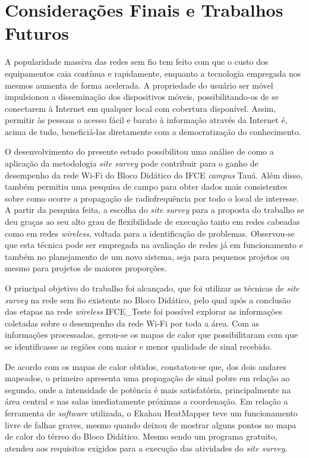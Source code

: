 \chapter{Considerações Finais e Trabalhos Futuros}
\label{cap:conclusoes-e-trabalhos-futuros}

A popularidade massiva das redes sem fio tem feito com que o custo dos equipamentos caia contínua e rapidamente, enquanto a tecnologia empregada nos mesmos aumenta de forma acelerada. A propriedade do usuário ser móvel impulsionou a disseminação dos dispositivos móveis, possibilitando-os de se conectarem à Internet em qualquer local com cobertura disponível. Assim, permitir às pessoas o acesso fácil e barato à informação através da Internet é, acima de tudo, beneficiá-las diretamente com a democratização do conhecimento.

O desenvolvimento do presente estudo possibilitou uma análise de como a aplicação da metodologia \textit{site survey} pode contribuir para o ganho de desempenho da rede Wi-Fi do Bloco Didático do IFCE \textit{campus} Tauá. Além disso, também permitiu uma pesquisa de campo para obter dados mais consistentes sobre como ocorre a propagação de radiofrequência por todo o local de interesse.
A partir da pesquisa feita, a escolha do \textit{site survey} para a proposta do trabalho se deu graças ao seu alto grau de flexibilidade de execução tanto em redes cabeadas como em redes \textit{wireless}, voltada para a identificação de problemas. Observou-se que esta técnica pode ser empregada na avaliação de redes já em funcionamento e também no planejamento de um novo sistema, seja para pequenos projetos ou mesmo para projetos de maiores proporções.

O principal objetivo do trabalho foi alcançado, que foi utilizar as técnicas de \textit{site survey} na rede sem fio existente no Bloco Didático, pelo qual após a conclusão das etapas na rede \textit{wireless} IFCE\_Teste foi possível explorar as informações coletadas sobre o desempenho da rede Wi-Fi por toda a área. Com as informações processadas, gerou-se os mapas de calor que possibilitaram com que se identificasse as regiões com maior e menor qualidade de sinal recebido.

De acordo com os mapas de calor obtidos, constatou-se que, dos dois andares mapeados, o primeiro apresenta uma propagação de sinal pobre em relação ao segundo, onde a intensidade de potência é mais satisfatória, principalmente na área central e nas salas imediatamente próximas a coordenação.
Em relação a ferramenta de \textit{software} utilizada, o Ekahau HeatMapper teve um funcionamento livre de falhas graves, mesmo quando deixou de mostrar alguns pontos no mapa de calor do térreo do Bloco Didático. Mesmo sendo um programa gratuito, atendeu aos requisitos exigidos para a execução das atividades do \textit{site survey}.

